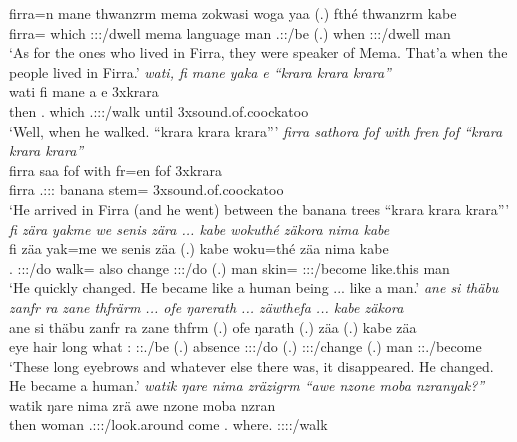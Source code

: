\begin{exe}
	\gll firra=n mane thwanzrm mema zokwasi woga yaa (.) fthé thwanzrm kabe\\
	firra=\Loc{} which \Stpl:\Sbj:\Pst:\Dur/dwell mema language man \Tsg.\Masc:\Pst:\Ipfv/be (.) when \Stpl:\Sbj:\Pst:\Dur/dwell man\\
	\trans `As for the ones who lived in Firra, they were speaker of Mema. That'a when the people lived in Firra.'
	\emph{wati, fi mane yaka e ``krara krara krara''}\\
	\gll wati fi mane a e 3x{krara}\\
	then \Third.\Abs{} which \Tsg.\Masc:\Sbj:\Pst:\Ipfv/walk until 3x{sound.of.coockatoo}\\
	\trans `Well, when he walked. ``krara krara krara'''
	\emph{firra sathora fof with fren fof ``krara krara krara''}\\
	\gll firra saa fof with fr=en fof 3x{krara}\\
	firra \Tsg.\Masc:\Sbj:\Pst:\Pfv{} \Emph{} banana stem=\Loc{} \Emph{} 3x{sound.of.coockatoo}\\
	\trans `He arrived in Firra (and he went) between the banana trees ``krara krara krara'''
	\emph{fi zära yakme we senis zära ... kabe wokuthé zäkora nima kabe}\\
	\gll fi zäa yak=me we senis zäa (.) kabe woku=thé zäa nima kabe\\
	\Third.\Abs{} \Stsg:\Sbj:\Pst:\Pfv/do walk=\Ins{} also change \Stsg:\Sbj:\Pst:\Pfv/do (.) man skin=\Adlzr{} \Stsg:\Sbj:\Pst:\Pfv/become {like.this} man\\
	\trans `He quickly changed. He became like a human being ... like a man.'
	\emph{ane si thäbu zanfr ra zane thfrärm ... ofe ŋarerath ... zäwthefa ... kabe zäkora}\\
	\gll ane si thäbu zanfr ra zane thfrm (.) ofe ŋarath (.) zäa (.) kabe zäa\\
	\Dem{} eye hair long what \Dem:\Prox{} \Stpl:\Sbj:\Pst.\Dur/be (.) absence \Stpl:\Sbj:\Pst:\Ipfv/do (.) \Stsg:\Sbj:\Pst:\Pfv/change (.) man \Stsg:\Sbj:\Pst.\Pfv/become\\
	\trans `These long eyebrows and whatever else there was, it disappeared. He changed. He became a human.'
	\emph{watik ŋare nima zräzigrm ``awe nzone moba nzranyak?''}\\
	\gll watik ŋare nima zrä awe nzone moba nzran\\
	then woman \Quot{} \Tsg.\F:\Sbj:\Irr:\Pfv/look.around come \Fsg.\Poss{} where.\Abl{} \Ssg:\Sbj:\Irr:\Ipfv:\Venit/walk\\\

\end{exe}
